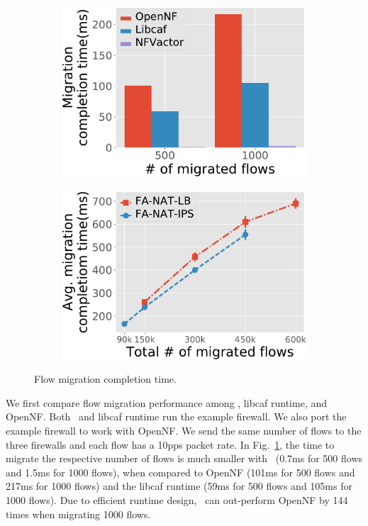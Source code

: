 \begin{figure}[!h]
 \begin{subfigure}[t]{0.49\linewidth}
   \centering
   \includegraphics[width=\columnwidth]{chap-nfvactor/exp-figure/migration_compare.pdf}
   \caption{}\label{fig:migration_compare} \end{subfigure}\hfill
  \begin{subfigure}[t]{0.49\linewidth}
   \centering
   \includegraphics[width=\columnwidth]{chap-nfvactor/exp-figure/migration_time.pdf}
   \caption{}\label{fig:migration_time}
  \end{subfigure}
\caption{Flow migration completion time.}
\end{figure}

We first compare flow migration performance among \nfactor, libcaf runtime, and OpenNF. Both \nfactor~and libcaf runtime run the example firewall. We also port the example firewall to work with OpenNF. We send the same number of flows to the three firewalls and each flow has a 10pps packet rate. In Fig.~\ref{fig:migration_compare}, the time to migrate the respective number of flows is much smaller with \nfactor~(0.7ms for 500 flows and 1.5ms for 1000 flows), when compared to OpenNF (101ms for 500 flows and 217ms for 1000 flows) and the libcaf runtime (59ms for 500 flows and 105ms for 1000 flows). Due to efficient runtime design, \nfactor~can out-perform OpenNF by 144 times when migrating 1000 flows.

